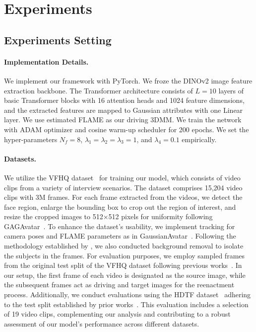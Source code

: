 \section{Experiments}

\subsection{Experiments Setting}
\paragraph{\textbf{Implementation Details.}}
We implement our framework with PyTorch. We froze the DINOv2 image feature extraction backbone. The Transformer architecture consists of $L=10$ layers of basic Transformer blocks with 16 attention heads and 1024 feature dimensions, and the extracted features are mapped to Gaussian attributes with one Linear layer. We use estimated FLAME as our driving 3DMM. We train the network with ADAM optimizer and cosine warm-up scheduler for 200 epochs. We set the hyper-parameters $N_{f}=8$, $\lambda_{1}=\lambda_{2}=\lambda_{3}=1$, and $\lambda_{4}=0.1$ empirically.

\paragraph{\textbf{Datasets.}}
We utilize the VFHQ dataset~\cite{vfhq} for training our model, which consists of video clips from a variety of interview scenarios. The dataset comprises 15,204 video clips with 3M frames. For each frame extracted from the videos, we detect the face region, enlarge the bounding box to crop out the region of interest, and resize the cropped images to 512×512 pixels for uniformity following GAGAvatar~\cite{GAGAvatar}. To enhance the dataset's usability, we implement tracking for camera poses and FLAME parameters as in GaussianAvatar~\cite{GaussianAvatar}. Following the methodology established by \cite{GPAvatar}, we also conducted background removal to isolate the subjects in the frames. For evaluation purposes, we employ sampled frames from the original test split of the VFHQ dataset following previous works~\cite{GPAvatar,GAGAvatar}. In our setup, the first frame of each video is designated as the source image, while the subsequent frames act as driving and target images for the reenactment process. Additionally, we conduct evaluations using the HDTF dataset~\cite{HTDF} adhering to the test split established by prior works~\cite{OTAvatar}. This evaluation includes a selection of 19 video clips, complementing our analysis and contributing to a robust assessment of our model’s performance across different datasets. 

